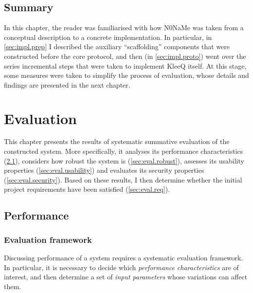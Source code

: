 \documentclass[a4paper, twoside, 12pt]{report}
\newcommand{\funkytt}{\fontfamily{AnonymousPro}\selectfont}
\newcommand{\skippage}{\cleardoublepage}
\begin{document}
\section{Summary}
In this chapter, the reader was familiarised with how {\funkytt N0NaMe} was taken from a conceptual description to a concrete implementation. In particular, in \cref{sec:impl.prep} I described the auxiliary ``scaffolding'' components that were constructed before the core protocol, and then (in \cref{sec:impl.proto}) went over the series incremental steps that were taken to implement KleeQ itself. At this stage, some measures were taken to simplify the process of evaluation, whose details and findings are presented in the next chapter.

\skippage


\chapter{Evaluation}
This chapter presents the results of systematic summative evaluation of the constructed system. More specifically, it analyses its performance characteristics (\cref{sec:eval.perf}), considers how robust the system is (\cref{sec:eval.robust}), assesses its usability properties (\cref{sec:eval.usability}) and evaluates its security properties (\cref{sec:eval.security}). Based on these results, I then determine whether the initial project requirements have been satisfied (\cref{sec:eval.req}).


\section{Performance}
\label{sec:eval.perf}
\subsection{Evaluation framework}
\label{subsec:eval.pef.frame}
Discussing performance of a system requires a systematic evaluation framework. 
In particular, it is necessary to decide which \emph{performance characteristics} are of interest, and then determine a set of \emph{input parameters} whose variations can affect them. \\
\end{document}

